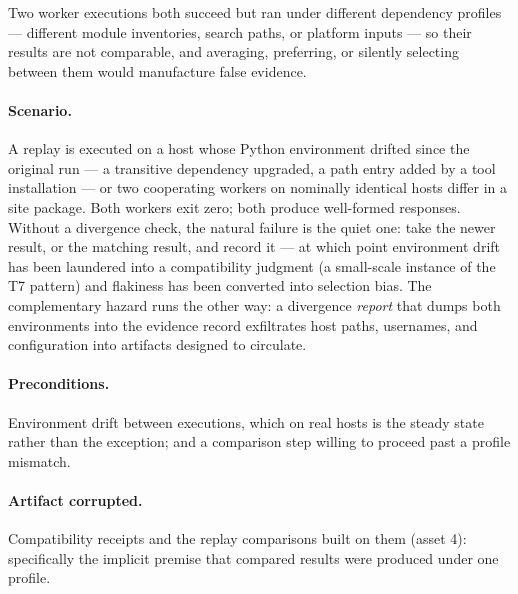 \begin{threat}\label{threat:thr:divergence}
Two worker executions both succeed but ran under different dependency profiles --- different module inventories, search paths, or platform inputs --- so their results are not comparable, and averaging, preferring, or silently selecting between them would manufacture false evidence.
\end{threat}

\paragraph{Scenario.} A replay is executed on a host whose Python environment drifted since the original run --- a transitive dependency upgraded, a path entry added by a tool installation --- or two cooperating workers on nominally identical hosts differ in a site package. Both workers exit zero; both produce well-formed responses. Without a divergence check, the natural failure is the quiet one: take the newer result, or the matching result, and record it --- at which point environment drift has been laundered into a compatibility judgment (a small-scale instance of the T7 pattern) and flakiness has been converted into selection bias. The complementary hazard runs the other way: a divergence \emph{report} that dumps both environments into the evidence record exfiltrates host paths, usernames, and configuration into artifacts designed to circulate.

\paragraph{Preconditions.} Environment drift between executions, which on real hosts is the steady state rather than the exception; and a comparison step willing to proceed past a profile mismatch.

\paragraph{Artifact corrupted.} Compatibility receipts and the replay comparisons built on them (asset 4): specifically the implicit premise that compared results were produced under one profile.

